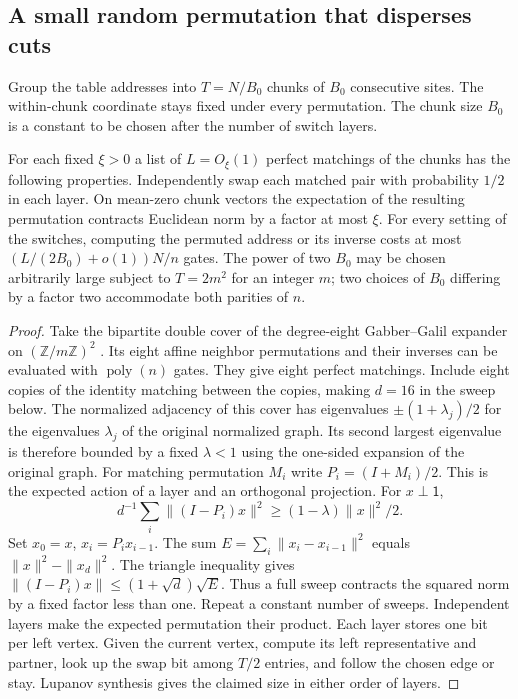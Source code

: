 \documentclass[11pt]{article}
\begin{document}
\subsection{A small random permutation that disperses cuts}

Group the table addresses into $T=N/B_0$ chunks of $B_0$ consecutive sites. The within-chunk coordinate stays fixed under every permutation. The chunk size $B_0$ is a constant to be chosen after the number of switch layers.

\begin{lemma}\label{l:switch}
For each fixed $\xi>0$ a list of $L=O_\xi(1)$ perfect matchings of the chunks has the following properties. Independently swap each matched pair with probability $1/2$ in each layer. On mean-zero chunk vectors the expectation of the resulting permutation contracts Euclidean norm by a factor at most $\xi$. For every setting of the switches, computing the permuted address or its inverse costs at most $(L/(2B_0)+o(1))N/n$ gates. The power of two $B_0$ may be chosen arbitrarily large subject to $T=2m^2$ for an integer $m$; two choices of $B_0$ differing by a factor two accommodate both parities of $n$.
\end{lemma}
\begin{proof}
Take the bipartite double cover of the degree-eight Gabber--Galil expander on $(\mathbb Z/m\mathbb Z)^2$ \cite{gg}. Its eight affine neighbor permutations and their inverses can be evaluated with $\operatorname{poly}(n)$ gates. They give eight perfect matchings. Include eight copies of the identity matching between the copies, making $d=16$ in the sweep below. The normalized adjacency of this cover has eigenvalues $\pm(1+\lambda_j)/2$ for the eigenvalues $\lambda_j$ of the original normalized graph. Its second largest eigenvalue is therefore bounded by a fixed $\lambda<1$ using the one-sided expansion of the original graph. For matching permutation $M_i$ write $P_i=(I+M_i)/2$. This is the expected action of a layer and an orthogonal projection. For $x\perp\mathsf{1}$,
\[
 d^{-1}\sum_i\|(I-P_i)x\|^2\ge(1-\lambda)\|x\|^2/2 .
\]
Set $x_0=x$, $x_i=P_i x_{i-1}$. The sum $E=\sum_i\|x_i-x_{i-1}\|^2$ equals $\|x\|^2-\|x_d\|^2$. The triangle inequality gives $\|(I-P_i)x\|\le(1+\sqrt d)\sqrt E$. Thus a full sweep contracts the squared norm by a fixed factor less than one. Repeat a constant number of sweeps. Independent layers make the expected permutation their product. Each layer stores one bit per left vertex. Given the current vertex, compute its left representative and partner, look up the swap bit among $T/2$ entries, and follow the chosen edge or stay. Lupanov synthesis gives the claimed size in either order of layers.
\end{proof}
\end{document}
